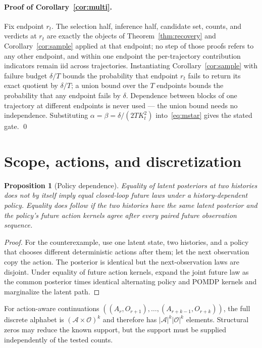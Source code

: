 \documentclass{article}
\newtheorem{proposition}[theorem]{Proposition}
\newcommand{\cA}{\mathcal A}
\newcommand{\cO}{\mathcal O}
\begin{document}
\paragraph{Proof of Corollary~\ref{cor:multi}.}
Fix endpoint $r_t$.  The selection half, inference half, candidate set,
counts, and verdicts at $r_t$ are exactly the objects of
Theorem~\ref{thm:recovery} and Corollary~\ref{cor:sample} applied at that
endpoint; no step of those proofs refers to any other endpoint, and within
one endpoint the per-trajectory contribution indicators remain iid across
trajectories.  Instantiating Corollary~\ref{cor:sample} with failure budget
$\delta/T$ bounds the probability that endpoint $r_t$ fails to return its
exact quotient by $\delta/T$; a union bound over the $T$ endpoints bounds
the probability that any endpoint fails by $\delta$.  Dependence between
blocks of one trajectory at different endpoints is never used --- the union
bound needs no independence.  Substituting
$\alpha=\beta=\delta/(2TK_t^2)$ into~\eqref{eq:mstar} gives the stated
gate. \qed

\section{Scope, actions, and discretization}            \label{app:scope}

\begin{proposition}[Policy dependence]
Equality of latent posteriors at two histories does not by itself imply equal
closed-loop future laws under a history-dependent policy.  Equality does
follow if the two histories have the same latent posterior and the policy's
future action kernels agree after every paired future observation sequence.
\end{proposition}
\begin{proof}
For the counterexample, use one latent state, two histories, and a policy that
chooses different deterministic actions after them; let the next observation
copy the action.  The posterior is identical but the next-observation laws are
disjoint.  Under equality of future action kernels, expand the joint future
law as the common posterior times identical alternating policy and POMDP
kernels and marginalize the latent path.
\end{proof}

For action-aware continuations
$((A_r,O_{r+1}),\ldots,(A_{r+k-1},O_{r+k}))$, the full discrete alphabet is
$(\cA\times\cO)^k$ and therefore has $|\cA|^k|\cO|^k$ elements.  Structural
zeros may reduce the known support, but the support must be supplied independently
of the tested counts.
\end{document}
